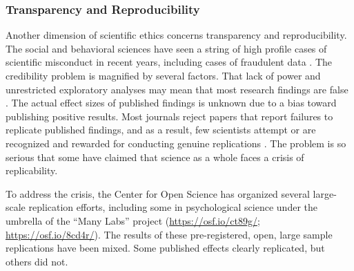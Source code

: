\documentclass[letterpaper,man,apacite]{apa6}
\begin{document}
\subsubsection{Transparency and Reproducibility}

Another dimension of scientific ethics concerns transparency and reproducibility.
The social and behavioral sciences have seen a string of high profile cases of scientific misconduct in recent years, including cases of fraudulent data \cite{singal_case_2015, bhattacharjee_diederik_2013}.
The credibility problem is magnified by several factors.
That lack of power and unrestricted exploratory analyses may mean that most research findings are false \cite{ioannidis_why_2005}.
The actual effect sizes of published findings is unknown due to a bias toward publishing positive results.
Most journals reject papers that report failures to replicate published findings, and as a result, few scientists attempt or are recognized and rewarded for conducting genuine replications \cite{nosek_scientific_2012}.
The problem is so serious that some have claimed that science as a whole faces a crisis of replicability.

To address the crisis, the Center for Open Science has organized several large-scale replication efforts, including some in psychological science under the umbrella of the ``Many Labs'' project (\url{https://osf.io/ct89g/}; \url{https://osf.io/8cd4r/}).
The results of these pre-registered, open, large sample replications have been mixed.
Some published effects clearly replicated, but others did not.
\end{document}
